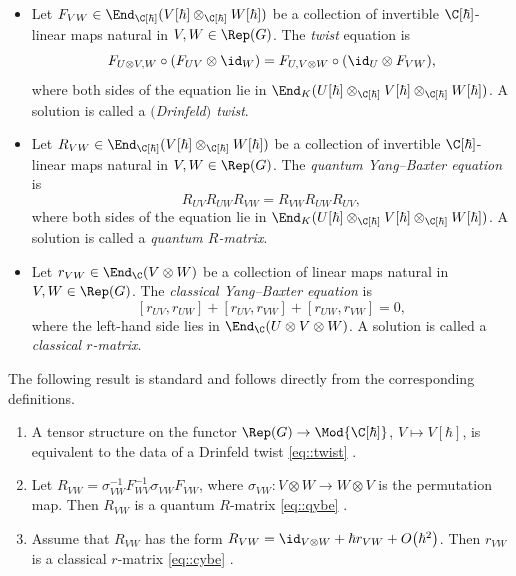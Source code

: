 	\begin{Definition}
		\label{def::all_constant}\qquad
		\begin{itemize}\itemsep=0pt
			\item Let $F_{VW} \in \End_{\C[\hbar]}(V[\hbar]\otimes_{\C[\hbar]} W[\hbar]) $ be a collection of invertible $\C[\hbar]$-linear maps natural in $V,W\in \Rep(G)$. The \emph{twist} equation is
			\begin{equation}
				\label{eq::twist}
				F_{U \otimes V,W} \circ (F_{UV} \otimes \id_W) = F_{U,V\otimes W} \circ (\id_U \otimes F_{VW}),
			\end{equation}
			where both sides of the equation lie in $\End_K(U[\hbar] \otimes_{\C[\hbar]} V[\hbar] \otimes_{\C[\hbar]} W[\hbar])$. A solution is called a \emph{$($Drinfeld$)$ twist}.
			\item Let $R_{VW}\in \End_{\C[\hbar]}(V[\hbar]\otimes_{\C[\hbar]} W[\hbar]) $ be a collection of invertible $\C[\hbar]$-linear maps natural in $V,W\in \Rep(G)$. The \emph{quantum Yang--Baxter equation} is
			\begin{equation}
				\label{eq::qybe}
				R_{UV} R_{UW} R_{VW} = R_{VW} R_{UW} R_{UV},
			\end{equation}
			where both sides of the equation lie in $\End_K(U[\hbar] \otimes_{\C[\hbar]} V[\hbar] \otimes_{\C[\hbar]} W[\hbar])$. A solution is called a \emph{quantum $R$-matrix}.
			\item Let $r_{VW}\in \End_{\C}(V\otimes W) $ be a collection of linear maps natural in $V,W\in \Rep(G)$. The \emph{classical Yang--Baxter equation} is
			\begin{equation}
				\label{eq::cybe}
				[r_{UV},r_{UW}] + [r_{UV},r_{VW}] + [r_{UW}, r_{VW}] = 0,
			\end{equation}
			where the left-hand side lies in $\End_{\C}(U \otimes V \otimes W)$. A solution is called a \emph{classical $r$-matrix}.
		\end{itemize}
	\end{Definition}
	
	The following result is standard and follows directly from the corresponding definitions.
	\begin{Proposition}\qquad
		\begin{enumerate}\itemsep=0pt
			\item[$(1)$] A tensor structure on the functor
$
			\Rep(G) \rightarrow \Mod{\C[\hbar]}$, $ V \mapsto V[\hbar]$,
			is equivalent to the data of a Drinfeld twist \eqref{eq::twist} {\rm\cite[\emph{Definition} 2.4.1]{EGNO}}.
			\item[$(2)$] Let $R_{VW} = \sigma_{VW}^{-1} F_{WV}^{-1} \sigma_{VW} F_{VW}$, where $\sigma_{VW} \colon V \otimes W \rightarrow W \otimes V$ is the permutation map. Then $R_{VW}$ is a quantum $R$-matrix \eqref{eq::qybe} {\rm\cite[\emph{Definition} 8.1.1]{EGNO}}.
			\item[$(3)$] Assume that $R_{VW}$ has the form $R_{VW} = \id_{V \otimes W} + \hbar r_{VW} + O\bigl(\hbar^2\bigr)$. Then $r_{VW}$ is a classical $r$-matrix \eqref{eq::cybe} {\rm\cite[\emph{Proposition} 9.4]{EtingofSchiffmannQuantumGroups}}.
		\end{enumerate}
	\end{Proposition}
	
